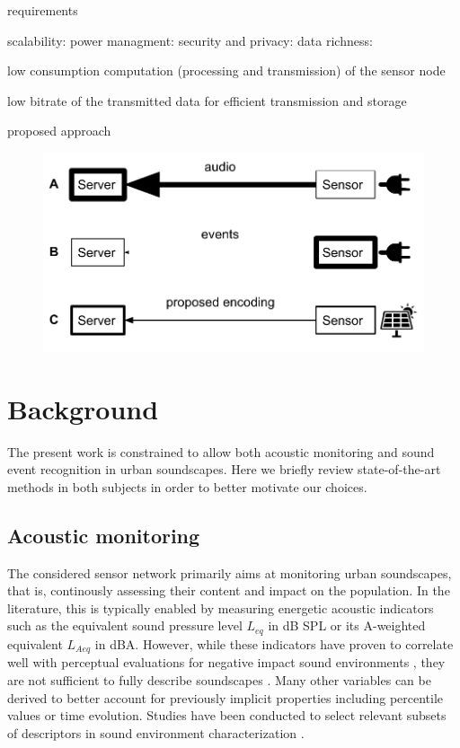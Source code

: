 \documentclass[final,3p,times,twocolumn]{elsarticle}
\begin{document}
requirements

scalability:
power managment:
security and privacy:
data richness:

low consumption computation (processing and transmission) of the sensor node

low bitrate of the transmitted data for efficient transmission and storage

proposed approach





\begin{figure}[t]
\includegraphics[width=\columnwidth]{figures/censeCoder}
\vspace{-0.15in}
\caption{}
\label{fig:codingScheme}
\end{figure}


\section{Background}


The present work is constrained to allow both acoustic monitoring and sound event recognition in urban soundscapes. Here we briefly review state-of-the-art methods in both subjects in order to better motivate our choices.

\subsection{Acoustic monitoring}

The considered sensor network primarily aims at monitoring urban soundscapes, that is, continously assessing their content and impact on the population. In the literature, this is typically enabled by measuring energetic acoustic indicators such as the equivalent sound pressure level $L_{eq}$ in dB SPL or its A-weighted equivalent $L_{Aeq}$ in dBA. However, while these indicators have proven to correlate well with perceptual evaluations for negative impact sound environments \cite{gozalo2015}, they are not sufficient to fully describe soundscapes \cite{rychtarikova2013}. Many other variables can be derived to better account for previously implicit properties \cite{can2016} including percentile values or time evolution. Studies have been conducted to select relevant subsets of descriptors in sound environment characterization \cite{can2015, brocolini2013, nilsson2007}.\\
\end{document}
